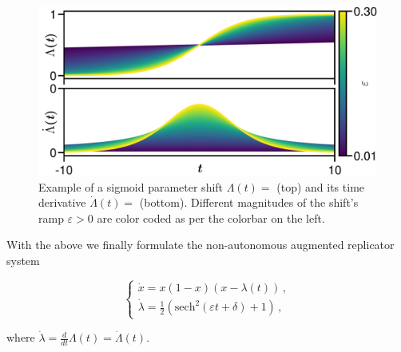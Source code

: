 \documentclass[../main.tex]{subfiles}
\begin{document}
\begin{figure}[H]
    \centering 
    \includegraphics[keepaspectratio, width=\textwidth]{../figures/fig:sigmoid_example.png}
    \caption{Example of a sigmoid parameter shift $\Lambda(t) = $ (top) and its time derivative $\dot{\Lambda}(t) = $ (bottom). Different magnitudes of the shift's ramp $\varepsilon>0$ are color coded as per the colorbar on the left.
    }
    \label{fig:sigmoid_example}
\end{figure}

With the above we finally formulate the non-autonomous augmented replicator system 

\begin{equation}\label{eq:nonautonomous_shifted}
   \begin{cases}
           \dot{x} = x(1-x)(x - \lambda(t))\,, \\
           \dot{\lambda} =  \frac{1}{2}(\text{sech}^{2}(\varepsilon t + \delta) + 1)\,,
   \end{cases}
\end{equation}

where $\dot{\lambda} = \frac{d}{dt}\Lambda(t) = \dot{\Lambda}(t)$.
\end{document}
